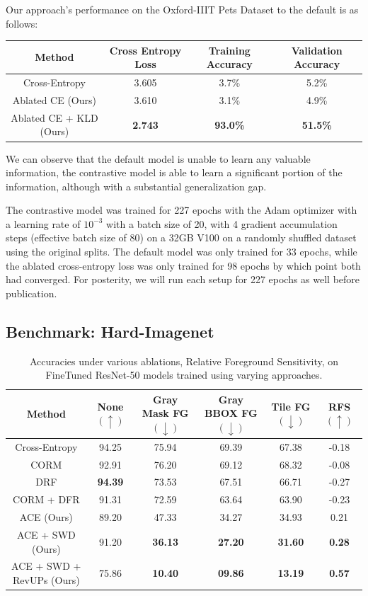 \documentclass{article}
\theoremstyle{plain}
\theoremstyle{definition}
\theoremstyle{remark}
\begin{document}
Our approach's performance on the Oxford-IIIT Pets Dataset to the default is as follows:

\begin{table}[h]
	\centering
	\begin{tabular}{c|ccc}
		\toprule
		\textbf{Method}  & \textbf{Cross Entropy Loss}  & \textbf{Training Accuracy}   & \textbf{Validation Accuracy} \\
		\midrule
		Cross-Entropy & 3.605 & 3.7\% & 5.2\% \\
		Ablated CE (Ours) & 3.610 & 3.1\% & 4.9\% \\
		Ablated CE + KLD (Ours) & \bf 2.743 & \bf 93.0\% & \bf 51.5\% \\
		\bottomrule
	\end{tabular}
\end{table}

We can observe that the default model is unable to learn any valuable information, the contrastive model is able to learn a significant portion of the information, although with a substantial generalization gap.

The contrastive model was trained for 227 epochs with the Adam optimizer with a learning rate of $10^{-3}$ with a batch size of 20, with 4 gradient accumulation steps (effective batch size of 80) on a 32GB V100 on a randomly shuffled dataset using the original splits. The default model was only trained for 33 epochs, while the ablated cross-entropy loss was only trained for 98 epochs by which point both had converged. For posterity, we will run each setup for 227 epochs as well before publication.

\subsection{Benchmark: Hard-Imagenet}

\begin{table}[H]
	\centering
	\caption{Accuracies under various ablations, Relative Foreground Sensitivity, on FineTuned ResNet-50 models trained using varying approaches.}
	\begin{tabular}{c|c|ccc|c}
		\toprule
		\textbf{Method} & \textbf{None} $(\uparrow)$ & \textbf{Gray Mask FG} $(\downarrow)$ & \textbf{Gray BBOX FG} $(\downarrow)$ & \textbf{Tile FG} $(\downarrow)$ & \textbf{RFS} $(\uparrow)$ \\
		\midrule
		Cross-Entropy & 94.25 & 75.94 & 69.39 & 67.38 & -0.18 \\
		\midrule
		CORM & 92.91 & 76.20 & 69.12 & 68.32 & -0.08 \\
		DRF & \bf 94.39 & 73.53 & 67.51 & 66.71 & -0.27 \\
		CORM + DFR & 91.31 & 72.59 & 63.64 & 63.90 & -0.23 \\
		\midrule
		ACE (Ours) & 89.20 & 47.33 & 34.27 & 34.93 & 0.21 \\
		ACE + SWD (Ours) & 91.20 & \bf 36.13 & \bf 27.20 & \bf 31.60 & \bf 0.28 \\
		ACE + SWD + RevUPs (Ours) & 75.86 & \bf 10.40 & \bf 09.86 & \bf 13.19 & \bf 0.57 \\
		\bottomrule
	\end{tabular}
\end{table}
\end{document}
